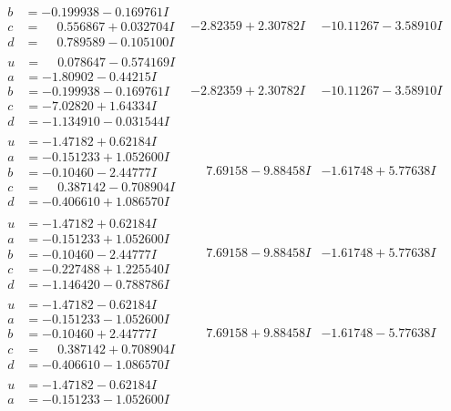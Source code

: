 \documentclass[1p]{elsarticle_modified}
\theoremstyle{definition}
\begin{document}
$$\begin{array}{c|c|c}
\begin{aligned}
b &= -0.199938 - 0.169761 I \\
c &= \phantom{-}0.556867 + 0.032704 I \\
d &= \phantom{-}0.789589 - 0.105100 I\end{aligned}
 & -2.82359 + 2.30782 I & -10.11267 - 3.58910 I \\ \hline\begin{aligned}
u &= \phantom{-}0.078647 - 0.574169 I \\
a &= -1.80902 - 0.44215 I \\
b &= -0.199938 - 0.169761 I \\
c &= -7.02820 + 1.64334 I \\
d &= -1.134910 - 0.031544 I\end{aligned}
 & -2.82359 + 2.30782 I & -10.11267 - 3.58910 I \\ \hline\begin{aligned}
u &= -1.47182 + 0.62184 I \\
a &= -0.151233 + 1.052600 I \\
b &= -0.10460 - 2.44777 I \\
c &= \phantom{-}0.387142 - 0.708904 I \\
d &= -0.406610 + 1.086570 I\end{aligned}
 & \phantom{-}7.69158 - 9.88458 I & -1.61748 + 5.77638 I \\ \hline\begin{aligned}
u &= -1.47182 + 0.62184 I \\
a &= -0.151233 + 1.052600 I \\
b &= -0.10460 - 2.44777 I \\
c &= -0.227488 + 1.225540 I \\
d &= -1.146420 - 0.788786 I\end{aligned}
 & \phantom{-}7.69158 - 9.88458 I & -1.61748 + 5.77638 I \\ \hline\begin{aligned}
u &= -1.47182 - 0.62184 I \\
a &= -0.151233 - 1.052600 I \\
b &= -0.10460 + 2.44777 I \\
c &= \phantom{-}0.387142 + 0.708904 I \\
d &= -0.406610 - 1.086570 I\end{aligned}
 & \phantom{-}7.69158 + 9.88458 I & -1.61748 - 5.77638 I \\ \hline\begin{aligned}
u &= -1.47182 - 0.62184 I \\
a &= -0.151233 - 1.052600 I \\

\end{aligned}
\end{array}$$
\end{document}
